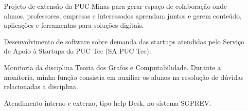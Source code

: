 Projeto de extensão da PUC Minas para gerar espaço de colaboração onde alunos, professores, empresas e interessados aprendam juntos e gerem conteúdo, aplicações e ferramentas para soluções digitais.

\divider
{}
Desenvolvimento de software sobre demanda das startups atendidas pelo Serviço de Apoio à Startups do PUC Tec (SA PUC Tec).
                    
\divider
{}
Monitoria da disciplina Teoria dos Grafos e Computabilidade. Durante a monitoria, minha função consistia em auxiliar os alunos na resolução de dúvidas relacionadas a disciplina.

\divider
{}
Atendimento interno e externo, tipo help Desk, no sistema SGPREV.